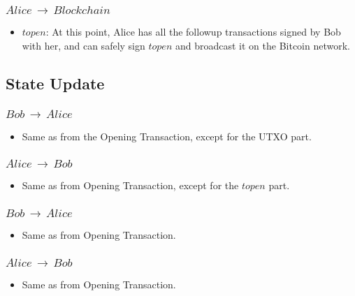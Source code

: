\subsubsection{$Alice\,\to\,Blockchain$}
\begin{itemize}[leftmargin=4\parindent]
    \item $\mathit{topen}$: At this point, Alice has all the followup transactions signed by Bob with her, and can safely sign $\mathit{topen}$ and broadcast it on the Bitcoin network.
\end{itemize}

\subsection{State Update}
\subsubsection{$Bob\,\to\,Alice$}
\begin{itemize}[leftmargin=4\parindent]
    \item Same as from the Opening Transaction, except for the UTXO part.
\end{itemize}
\subsubsection{$Alice\,\to\,Bob$}
\begin{itemize}[leftmargin=4\parindent]
\item Same as from Opening Transaction, except for the $\mathit{topen}$ part.
\end{itemize}
\subsubsection{$Bob\,\to\,Alice$}
\begin{itemize}[leftmargin=4\parindent]
    \item Same as from Opening Transaction.
\end{itemize}
\subsubsection{$Alice\,\to\,Bob$}
\begin{itemize}[leftmargin=4\parindent]
    \item Same as from Opening Transaction.
\end{itemize}

